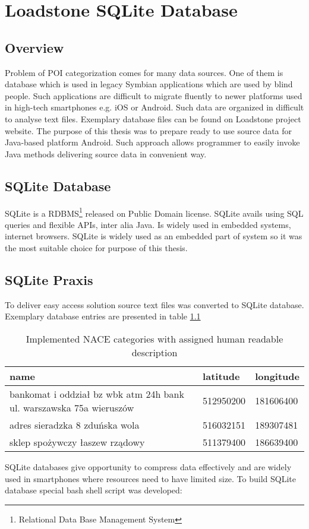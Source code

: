\chapter{Loadstone SQLite Database}\label{chap.loadstone}

\section{Overview}
Problem of POI categorization comes for many data sources. One of them is database which is used in legacy Symbian applications which are used by blind people. Such applications are difficult to migrate fluently to newer platforms used in high-tech smartphones e.g. iOS or Android. Such data are organized in difficult to analyse text files. Exemplary database files can be found on Loadstone project website. \cite{29} The purpose of this thesis was to prepare ready to use source data for Java-based platform Android. Such approach allows programmer to easily invoke Java methods delivering source data in convenient way.

\section{SQLite Database}
SQLite is a RDBMS\footnote{Relational Data Base Management System} released on Public Domain license. SQLite avails using SQL queries and flexible APIs, inter alia Java. Is widely used in embedded systems, internet browsers. SQLite is widely used as an embedded part of system so it was the most suitable choice for purpose of this thesis.
\section{SQLite Praxis}
To deliver easy access solution source text files \cite{29} was converted to SQLite database. Exemplary database entries are presented in table \ref{tab:loadstoneEntry} 
\newline
\begin{table}[H] 
	\begin{tabular}{ | l | l | l|}
		\hline
		name & latitude & longitude\tabularnewline\hline
		bankomat i oddział bz wbk atm 24h bank ul. warszawska 75a wieruszów& 512950200& 181606400\\
		adres  sieradzka 8 zduńska wola& 516032151& 189307481\\
		sklep spożywczy łaszew rządowy& 511379400& 186639400\\
		\hline
	\end{tabular}
	\caption{Implemented NACE categories with assigned human readable description}
	\label{tab:loadstoneEntry}
\end{table} 
SQLite databases give opportunity to compress data effectively and are widely used in smartphones where resources need to have limited size. To build SQLite database special bash shell script was developed:

